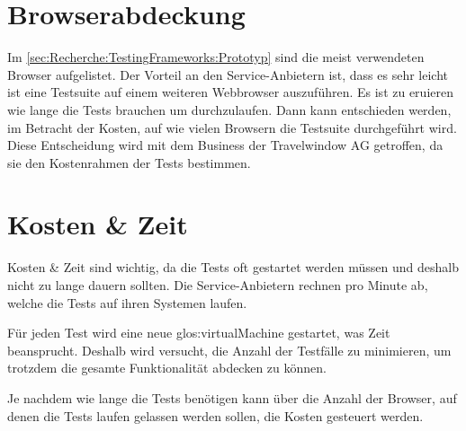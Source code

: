 \section{Browserabdeckung}
Im \cref{sec:Recherche:TestingFrameworks:Prototyp}  sind die meist verwendeten Browser aufgelistet. Der Vorteil an den Service-Anbietern ist, dass es sehr leicht ist eine Testsuite auf einem weiteren Webbrowser auszuführen. Es ist zu eruieren wie lange die Tests brauchen um durchzulaufen. Dann kann entschieden werden, im Betracht der Kosten, auf wie vielen Browsern die Testsuite durchgeführt wird. Diese Entscheidung wird mit dem Business der Travelwindow AG getroffen, da sie den Kostenrahmen der Tests bestimmen.

\section{Kosten \& Zeit}
Kosten \& Zeit sind wichtig, da die Tests oft gestartet werden müssen und deshalb nicht zu lange dauern sollten. Die Service-Anbietern rechnen pro Minute ab, welche die Tests auf ihren Systemen laufen. 

Für jeden Test wird eine neue \Gls{glos:virtualMachine} gestartet, was Zeit beansprucht. Deshalb wird versucht, die Anzahl der Testfälle zu minimieren, um trotzdem die gesamte Funktionalität abdecken zu können.

Je nachdem wie lange die Tests benötigen kann über die Anzahl der Browser, auf denen die Tests laufen gelassen werden sollen, die Kosten gesteuert werden.